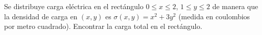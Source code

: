 \item Se distribuye carga eléctrica en el rectángulo $0 \le x \le 2$, $1 \le y \le 2$ de manera que la densidad de carga en $(x, y)$ es $\sigma(x, y) = x^2 + 3y^2$ (medida en coulombios por metro cuadrado). Encontrar la carga total en el rectángulo.
